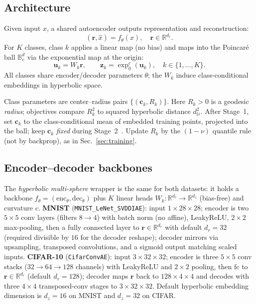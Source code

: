 \documentclass[conference]{IEEEtran}
\begin{document}
\subsection{Architecture}
Given input $x$, a shared autoencoder outputs representation and reconstruction:
\begin{equation}
(\mathbf{r}, \hat{x}) = f_{\theta}(x),\quad \mathbf{r}\in\mathbb{R}^{d_r}.
\end{equation}
For $K$ classes, class $k$ applies a linear map (no bias) and maps into the Poincar\'e ball $\mathbb{B}_c^d$ via the exponential map at the origin:
\begin{equation}
\mathbf{u}_k = W_k \mathbf{r},\qquad
\mathbf{z}_k = \exp_0^c(\mathbf{u}_k),\quad k\in\{1,\dots,K\}.
\end{equation}
All classes share encoder/decoder parameters $\theta$; the $W_k$ induce class-conditional embeddings in hyperbolic space.

Class parameters are center--radius pairs $\{(\mathbf{c}_k, R_k)\}$.
Here $R_k>0$ is a geodesic \emph{radius}; objectives compare $R_k^2$ to squared hyperbolic distance $d_{\mathbb{H}}^2$.
After Stage~1, set $\mathbf{c}_k$ to the class-conditional mean of embedded training points, projected into the ball; keep $\mathbf{c}_k$ \emph{fixed} during Stage~2~\cite{ruff2018deep}.
Update $R_k$ by the $(1{-}\nu)$ quantile rule (not by backprop), as in Sec.~\ref{sec:training}.

\subsection{Encoder--decoder backbones}\label{sec:backbone}
The \emph{hyperbolic multi-sphere} wrapper is the same for both datasets: it holds a backbone $f_\theta=(\mathrm{enc}_\theta,\mathrm{dec}_\theta)$ plus $K$ linear heads $W_k\colon\mathbb{R}^{d_r}\to\mathbb{R}^{d_z}$ (bias-free) and curvature $c$.
\textbf{MNIST} (\texttt{MNIST\_LeNet\_SVDDIAE}): input $1{\times}28{\times}28$; encoder is two $5{\times}5$ conv layers (filters $8{\to}4$) with batch norm (no affine), LeakyReLU, $2{\times}2$ max-pooling, then a fully connected layer to $\mathbf{r}\in\mathbb{R}^{d_r}$ with default $d_r{=}32$ (required divisible by $16$ for the decoder reshape); decoder mirrors via upsampling, transposed convolutions, and a sigmoid output matching scaled inputs.
\textbf{CIFAR-10} (\texttt{CifarConvAE}): input $3{\times}32{\times}32$; encoder is three $5{\times}5$ conv stacks ($32{\to}64{\to}128$ channels) with LeakyReLU and $2{\times}2$ pooling, then $\mathrm{fc}$ to $\mathbf{r}\in\mathbb{R}^{d_r}$ (default $d_r{=}128$); decoder maps $\mathbf{r}$ back to $128{\times}4{\times}4$ and decodes with three $4{\times}4$ transposed-conv stages to $3{\times}32{\times}32$.
Default hyperbolic embedding dimension is $d_z{=}16$ on MNIST and $d_z{=}32$ on CIFAR.
\end{document}

